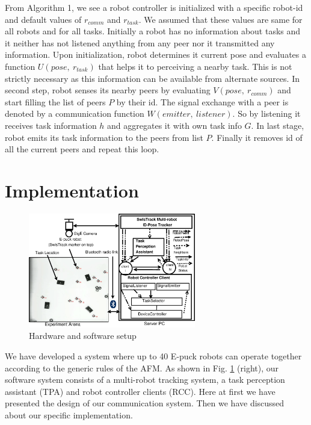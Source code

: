 \documentclass[letterpaper, 10 pt, conference]{ieeeconf}  %
\begin{document}
From Algorithm 1, we see a robot controller is initialized with a specific robot-id and default values of $r_{comm}$ and $r_{task}$. We assumed that these values are same for all robots and for all tasks.
Initially a robot has no information about tasks and it neither has not listened anything from any peer nor it transmitted any information. Upon initialization, robot determines it current pose and evaluates a function  $U(pose,~ r_{task})$ that helps it to perceiving a nearby task. This is not strictly necessary as this information can be available from alternate sources. In second step, robot senses its nearby peers by evaluating $V(pose,~ r_{comm})$ and start filling the list of peers $P$ by their id. The  signal exchange with a peer is denoted by  a communication function  $W(emitter,~listener)$. So by listening it receives task information $h$ and aggregates it with own task info $G$.  In last stage, robot emits its task information to the peers from list $P$. Finally it removes id of all the current peers and repeat this loop. 
%
\section{Implementation}
\label{sec:impl}
\begin{figure}
\centering
\includegraphics[height=5cm, angle=0]
{../dia-files/RIL-Expt-Setup2.eps}
\caption{\small Hardware and software setup}
\label{fig:setup} %
\end{figure}
We have developed a system where up to 40 E-puck robots \cite{Epuck} can operate together according to the generic rules of the AFM. As shown in Fig. \ref{fig:setup} (right), our software system consists of a multi-robot tracking system, a task perception assistant (TPA) and robot controller clients (RCC). Here at first we have presented the design of our communication system. Then we have discussed about our specific implementation. 
\end{document}
